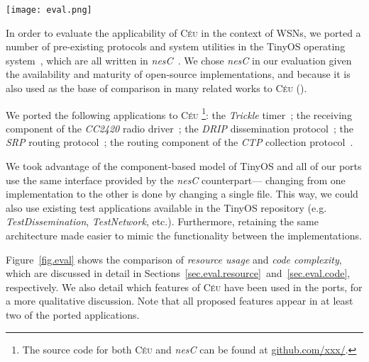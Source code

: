 \documentclass[10pt]{sensys-proc}
\newcommand{\CEU}{\textsc{C\'{e}u}\xspace}
\newcommand{\code}[1] {{\small{\texttt{#1}}}}
\begin{document}
\begin{figure*}[t]
\texttt{[image: eval.png]}
\caption{ Comparison between \CEU and \emph{nesC} for the ported applications.
\label{fig.eval}
}
\end{figure*}

In order to evaluate the applicability of \CEU in the context of WSNs, we 
ported a number of pre-existing protocols and system utilities in the TinyOS 
operating system~\cite{wsn.tos}, which are all written in 
\emph{nesC}~\cite{wsn.nesc}.
We chose \emph{nesC} in our evaluation given the availability and maturity of 
open-source implementations, and because it is also used as the base of 
comparison in many related works to \CEU 
(\cite{wsn.protothreads,wsn.sol,wsn.ocram,wsn.flowtalk}).

We ported the following applications to \CEU%
\footnote{The source code for both \CEU and \emph{nesC} can be found at
\url{github.com/xxx/}.}:
the \emph{Trickle} timer~\cite{wsn.trickle};
the receiving component of the \emph{CC2420} radio driver~\cite{wsn.teps};
the \emph{DRIP} dissemination protocol~\cite{wsn.teps};
the \emph{SRP} routing protocol~\cite{wsn.teps};
the routing component of the \emph{CTP} collection protocol~\cite{wsn.ctp}.

We took advantage of the component-based model of TinyOS and all of our ports 
use the same interface provided by the \emph{nesC} counterpart---
changing from one implementation to the other is done by changing a single 
file.
This way, we could also use existing test applications available in the TinyOS 
repository (e.g. \emph{TestDissemination}, \emph{TestNetwork}, etc.).
Furthermore, retaining the same architecture made easier to mimic the 
functionality between the implementations.

Figure~\ref{fig.eval} shows the comparison of \emph{resource usage} and 
\emph{code complexity}, which are discussed in detail in
Sections~\ref{sec.eval.resource}~and~\ref{sec.eval.code}, respectively.
We also detail which features of \CEU have been used in the ports, for a more 
qualitative discussion.
Note that all proposed features appear in at least two of the ported 
applications.

\begin{comment}
TODO

However, without architectural changes, we could not express XXX how.
more lines, more ROM
    - not always represent the Céu way
        - full DRIP 40%

and is used  works (e.g. \cite{wsn.protothreads,wsn.sol,wsn.flask}) already 
        include comparisons to nesc, allowing (at least) an indirect comparison 
of \CEU{} with them.

\footnote {
    We used $TinyOS-2.1.1$ and $micaz$ motes, and the sample applications found 
in \code{/opt/tinyos-2.1.1/apps/}.
}
\end{comment}
\end{document}
